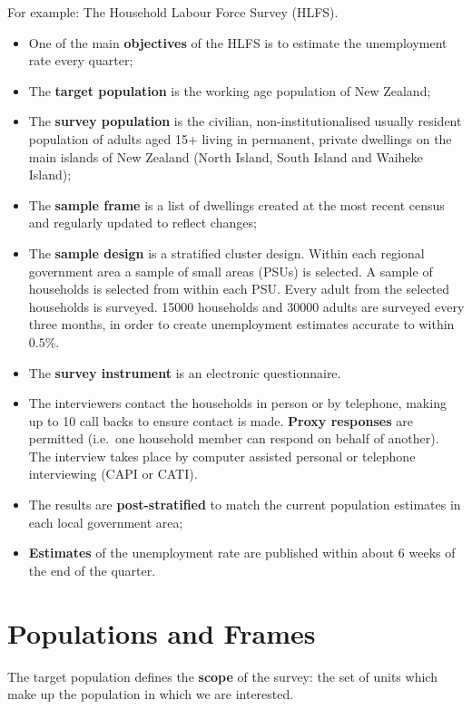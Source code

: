 \documentclass[
]{book}
\providecommand{\tightlist}{%
  \setlength{\itemsep}{0pt}\setlength{\parskip}{0pt}}
\begin{document}
For example: The Household Labour Force Survey (HLFS).

\begin{itemize}
\tightlist
\item
  One of the main \textbf{objectives} of the HLFS is to estimate the
  unemployment rate every quarter;
\item
  The \textbf{target population} is the working age population of
  New Zealand;
\item
  The \textbf{survey population} is the civilian, non-institutionalised
  usually resident population of adults aged 15+
  living in permanent, private dwellings on the main islands of New
  Zealand (North Island, South Island and Waiheke Island);
\item
  The \textbf{sample frame} is a list of dwellings created at the most recent
  census and regularly updated to reflect changes;
\item
  The \textbf{sample design} is a stratified cluster design. Within each regional
  government area a sample of small areas (PSUs) is selected. A sample of
  households is selected from within each PSU. Every adult from the selected
  households is surveyed. 15000 households and 30000 adults are surveyed every
  three months, in order to create unemployment estimates accurate to within
  \(0.5\)\%.
\item
  The \textbf{survey instrument} is an electronic questionnaire.
\item
  The interviewers contact the households in person or by telephone,
  making up to 10 call backs to ensure contact is made. \textbf{Proxy responses}
  are permitted (i.e.~one household member can respond on behalf of another).
  The interview takes place by computer assisted personal or telephone
  interviewing (CAPI or CATI).
\item
  The results are \textbf{post-stratified} to match the current population estimates
  in each local government area;
\item
  \textbf{Estimates} of the unemployment rate are published within about 6
  weeks of the end of the quarter.
\end{itemize}

\section{Populations and Frames}\label{populations-and-frames}

The target population defines the \textbf{scope} of the survey: the set of units
which make up the population in which we are interested.
\end{document}
